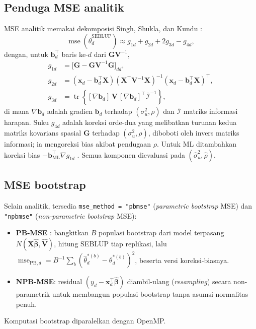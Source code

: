 \documentclass[11pt,a4paper]{article}
\theoremstyle{definition}
\begin{document}
\subsection{Penduga MSE analitik}

MSE analitik memakai dekomposisi Singh, Shukla, dan Kundu \cite{singh2005}:
\begin{equation}
  \operatorname{mse}(\hat{\theta}_d^{\mathrm{SEBLUP}})
  \approx g_{1d} + g_{2d} + 2g_{3d} - g_{4d},
\end{equation}
dengan, untuk $\mathbf{b}_d^{\top}$ baris ke-$d$ dari $\mathbf{G}\mathbf{V}^{-1}$,
\begin{align}
  g_{1d} &= \bigl[\mathbf{G} - \mathbf{G}\mathbf{V}^{-1}\mathbf{G}\bigr]_{dd}, \\
  g_{2d} &= (\mathbf{x}_d - \mathbf{b}_d^{\top}\mathbf{X})
            (\mathbf{X}^{\top}\mathbf{V}^{-1}\mathbf{X})^{-1}
            (\mathbf{x}_d - \mathbf{b}_d^{\top}\mathbf{X})^{\top}, \\
  g_{3d} &= \operatorname{tr}\!\left\{
            [\nabla\mathbf{b}_d]\,\mathbf{V}\,[\nabla\mathbf{b}_d]^{\top}
            \bar{\mathcal{I}}^{-1} \right\},
\end{align}
di mana $\nabla\mathbf{b}_d$ adalah gradien $\mathbf{b}_d$ terhadap
$(\sigma_u^2, \rho)$ dan $\bar{\mathcal{I}}$ matriks informasi harapan.
Suku $g_{4d}$ adalah koreksi orde-dua yang melibatkan turunan kedua matriks
kovarians spasial $\mathbf{G}$ terhadap $(\sigma_u^2, \rho)$, diboboti oleh
invers matriks informasi; ia mengoreksi bias akibat pendugaan $\rho$.
Untuk ML ditambahkan koreksi bias $-\mathbf{b}_{\mathrm{ML}}^{\top}\nabla g_{1d}$
\cite{datta2000}. Semua komponen dievaluasi pada $(\hat{\sigma}_u^2, \hat{\rho})$.

\subsection{MSE bootstrap}

Selain analitik, tersedia \texttt{mse\_method = "pbmse"} (\emph{parametric bootstrap}
MSE) dan \texttt{"npbmse"} (\emph{non-parametric bootstrap} MSE):
\begin{itemize}[nosep]
  \item \textbf{PB-MSE} \cite{gonzalez2008}: bangkitkan $B$ populasi bootstrap dari model
    terpasang $N(\mathbf{X}\hat{\boldsymbol{\beta}}, \hat{\mathbf{V}})$,
    hitung SEBLUP tiap replikasi, lalu
    $\operatorname{mse}_{\mathrm{PB},d} = B^{-1}\sum_{b}(\hat{\theta}_d^{*(b)} - \theta_d^{*(b)})^2$,
    beserta versi koreksi-biasnya.
  \item \textbf{NPB-MSE}: residual $(y_d - \mathbf{x}_d^{\top}\hat{\boldsymbol{\beta}})$
    diambil-ulang (\emph{resampling}) secara non-parametrik untuk membangun populasi
    bootstrap tanpa asumsi normalitas penuh.
\end{itemize}
Komputasi bootstrap diparalelkan dengan OpenMP.
\end{document}
